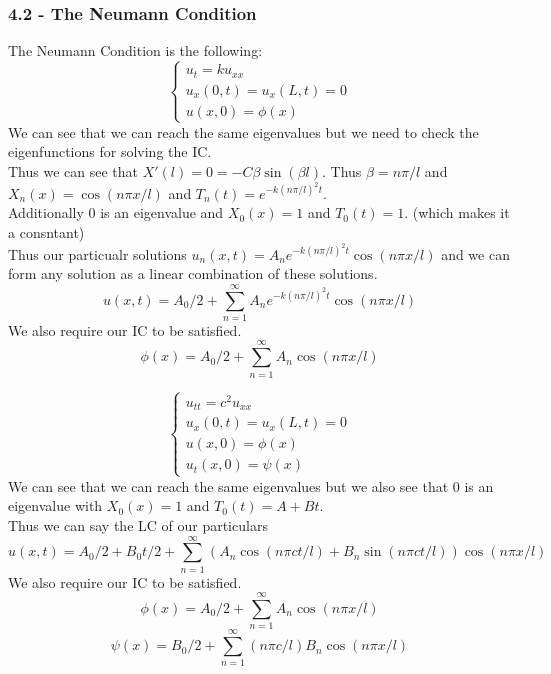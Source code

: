 \documentclass[answers,12pt,addpoints]{exam}
\begin{document}
\subsubsection{4.2 - The Neumann Condition}
\begin{definition}
    The Neumann Condition is the following:
    $$ \begin{cases}
        u_t = ku_{xx} \\
        u_x(0,t) = u_x(L,t) = 0 \\
        u(x,0) = \phi(x)
    \end{cases}$$
    We can see that we can reach the same eigenvalues but we need to check the eigenfunctions for solving the IC. \\
    Thus we can see that $X'(l) = 0 = -C \beta \sin(\beta l)$. Thus $\beta = n\pi/l$ and $X_n(x) = \cos(n\pi x/l)$ and $T_n(t) = e^{-k(n\pi/l)^2 t}$.\\
    Additionally $0$ is an eigenvalue and $X_0(x) = 1$ and $T_0(t) = 1$. (which makes it a consntant)\\
    Thus our particualr solutions $u_n(x,t) = A_n e^{-k(n\pi/l)^2 t} \cos(n\pi x/l)$ and we can form any solution as a linear combination of these solutions.
    $$ u(x,t) = A_0/2 + \sum_{n=1}^\infty A_n e^{-k(n\pi/l)^2 t} \cos(n\pi x/l)$$
    We also require our IC to be satisfied.
    $$ \phi(x) = A_0/2 + \sum_{n=1}^\infty A_n \cos(n\pi x/l)$$
\end{definition}
\begin{definition}
    $$\begin{cases}
        u_{tt} = c^2 u_{xx} \\
        u_x(0,t) = u_x(L,t) = 0 \\
        u(x,0) = \phi(x) \\
        u_t(x,0) = \psi(x)
    \end{cases}$$
    We can see that we can reach the same eigenvalues but we also see that $0$ is an eigenvalue with $X_0(x) = 1$ and $T_0(t) = A + Bt$.\\
    Thus we can say the LC of our particulars 
    $$ u(x,t) = A_0/2 + B_0 t/2 + \sum_{n=1}^\infty (A_n \cos(n\pi ct/l) + B_n \sin(n\pi ct/l)) \cos(n\pi x/l)$$
    We also require our IC to be satisfied.
    $$ \phi(x) = A_0/2 + \sum_{n=1}^\infty A_n \cos(n\pi x/l)$$
    $$ \psi(x) = B_0/2 + \sum_{n=1}^\infty (n \pi c/l) B_n \cos(n\pi x/l)$$ 
\end{definition}
\end{document}
